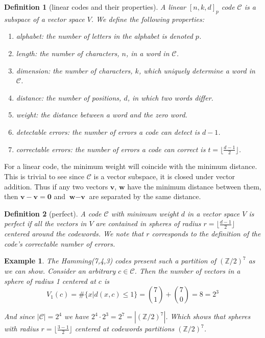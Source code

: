 \documentclass[paper=a4, fontsize=11pt]{scrartcl} %
\numberwithin{equation}{section} %
\numberwithin{figure}{section} %
\numberwithin{table}{section} %
\theoremstyle{break}
\newtheorem{defn}{Definition}
\newtheorem{ex}{Example}
\begin{document}
\begin{defn}[linear codes and their properties]
A linear $[n,k,d]_p$ code $\mathcal{C}$ is a subspace of a vector space $V$. We define the following properties:
\begin{enumerate}
\item \textit{alphabet}: the number of letters in the alphabet is denoted $p$.
\item \textit{length}: the number of characters, $n$, in a word in $\mathcal{C}$.
\item \textit{dimension}: the number of characters, $k$, which uniquely determine a word in $\mathcal{C}$.
\item \textit{distance}: the number of positions, $d$, in which two words differ.
\item \textit{weight}: the distance between a word and the zero word.
\item \textit{detectable errors}: the number of errors a code can detect is $d-1$.
\item \textit{correctable errors}: the number of errors a code can correct is $t=\lfloor \frac{d-1}{2} \rfloor$.
\end{enumerate} 
\end{defn}

For a linear code, the minimum weight will coincide with the minimum distance. This is trivial to see since $\mathcal{C}$ is a vector subspace, it is closed under vector addition. Thus if any two vectors $\textbf{v}$, $\textbf{w}$ have the minimum distance between them, then $\textbf{v}-\textbf{v}=\textbf{0}$ and $\textbf{w}-\textbf{v}$ are separated by the same distance.

\begin{defn}[perfect]
A code $\mathcal{C}$ with minimum weight $d$ in a vector space $V$ is \textit{perfect} if all the vectors in $V$ are contained in spheres of radius $r=\lfloor \frac{d-1}{2} \rfloor$ centered around the codewords. We note that $r$ corresponds to the definition of the code's correctable number of errors.
\end{defn}

\begin{ex}
The Hamming(7,4,3) codes present such a partition of $(\mathbb{Z}/2)^7$ as we can show. Consider an arbitrary $c \in \mathcal{C}$. Then the number of vectors in a sphere of radius 1 centered at $c$ is
$$
V_1(c) = \#\{x | d(x,c)\leq 1 \} = {7 \choose 1} + {7 \choose 0} = 8 = 2^3
$$

And since $|\mathcal{C}|= 2^4$ we have $2^4 \cdot 2^3 = 2^7=|(\mathbb{Z}/2)^7|$. Which shows that spheres with radius $r = \lfloor \frac{3-1}{2} \rfloor$ centered at codewords partitions $(\mathbb{Z}/2)^7$. 
\end{ex}
\end{document}
